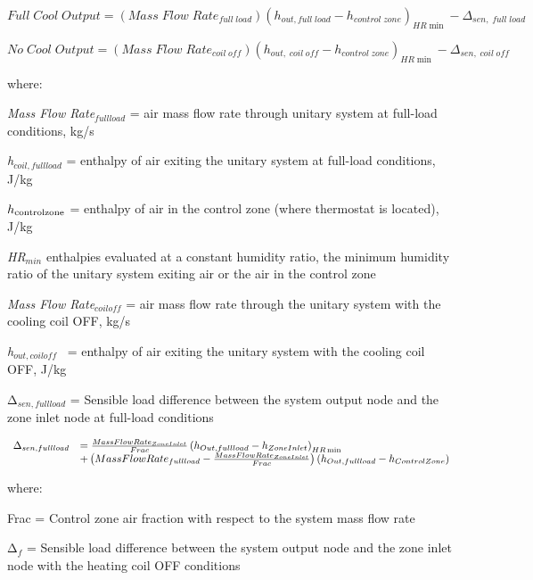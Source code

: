 \begin{equation}
Full\;Cool\;Output = (Mass\;Flow\;Rat{e_{full\;load}}){({h_{out,full\;load}} - {h_{control\;zone}})_{HR\min }} - {\Delta_{sen,\;full\;load}}
\end{equation}

\begin{equation}
No\;Cool\;Output = (Mass\;Flow\;Rat{e_{coil\;off}}){({h_{out,\;coil\;off}} - {h_{control\;zone}})_{HR\min }} - {\Delta_{sen,\;coil\;off}}
\end{equation}

where:

\emph{Mass Flow Rate\(_{full load}\)} = air mass flow rate through unitary system at full-load conditions, kg/s

\emph{h\(_{coil, full load}\)} = enthalpy of air exiting the unitary system at full-load conditions, J/kg

\(h_{\rm{control zone}}\) = enthalpy of air in the control zone (where thermostat is located), J/kg

\emph{HR\(_{min}\)} enthalpies evaluated at a constant humidity ratio, the minimum humidity ratio of the unitary system exiting air or the air in the control zone

\emph{Mass Flow Rate\(_{coil off}\)} = air mass flow rate through the unitary system with the cooling coil OFF, kg/s

\emph{h\(_{out,coil off}\)}~ = enthalpy of air exiting the unitary system with the cooling coil OFF, J/kg

Δ\(_{sen,full load}\) = Sensible load difference between the system output node and the zone inlet node at full-load conditions

\begin{equation}
  \begin{array}{rl}
    \Delta_{sen,full load} &= \frac{MassFlowRate_{ZoneInlet}}{Frac} \PB{h_{Out,full load} - h_{ZoneInlet}}_{HR\min} \\
                           &+ \PB{MassFlowRate_{full load} - \frac{MassFlowRate_{ZoneInlet}}{Frac}} \PB{ h_{Out,full load} - h_{ControlZone}}
  \end{array}
\end{equation}

where:

Frac = Control zone air fraction with respect to the system mass flow rate

Δ\(_{f}\) = Sensible load difference between the system output node and the zone inlet node with the heating coil OFF conditions


